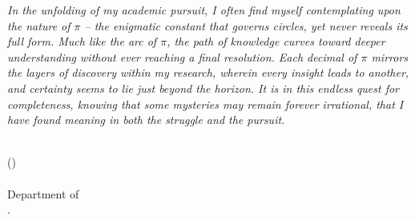 \begin{titlepage}
    \par\textsl{In the unfolding of my academic pursuit, I often find myself contemplating upon the nature of $\pi$ -- the enigmatic constant that governs circles, yet never reveals its full form. Much like the arc of $\pi$, the path of knowledge curves toward deeper understanding without ever reaching a final resolution. Each decimal of $\pi$ mirrors the layers of discovery within my research, wherein every insight leads to another, and certainty seems to lie just beyond the horizon. It is in this endless quest for completeness, knowing that some mysteries may remain forever irrational, that I have found meaning in both the struggle and the pursuit.}
    
    \bigskip\medskip
    \bigskip\medskip
    \bigskip\medskip\bigskip\medskip
    \noindent\\
    \hfill (\authorname)
    \noindent\\
    \hfill {\submissiontime} \\
    \hfill Department of \department\\
    \hfill \university.
\end{titlepage}